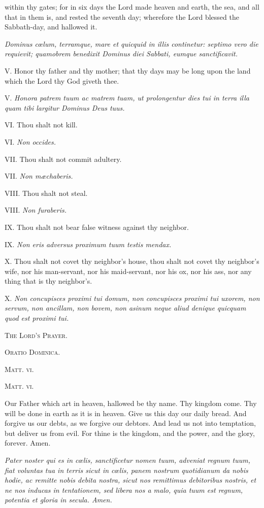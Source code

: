 within thy gates; for in six days the Lord made heaven and earth, the sea, and all that in them is, and rested the seventh day; wherefore the Lord blessed the Sabbath-day, and hallowed it.

\emph{Dominus cœlum, terramque, mare et quicquid in illis continetur: septimo vero die requievit; quamobrem benedixit Dominus diei Sabbati, eumque sanctificavit.}

V. Honor thy father and thy mother; that thy days may be long upon the land which the Lord thy God giveth thee.

V. \emph{Honora patrem tuum ac matrem tuam, ut prolongentur dies tui in terra illa quam tibi largitur Dominus Deus tuus.}

VI. Thou shalt not kill.

VI. \emph{Non occides.}

VII. Thou shalt not commit adultery.

VII. \emph{Non mæchaberis.}

VIII. Thou shalt not steal.

VIII. \emph{Non furaberis.}

IX. Thou shalt not bear false witness against thy neighbor.

IX. \emph{Non eris adversus proximum tuum testis mendax.}

X. Thou shalt not covet thy neighbor's house, thou shalt not covet thy neighbor's wife, nor his man-servant, nor his maid-servant, nor his ox, nor his ass, nor any thing that is thy neighbor's.

X. \emph{Non concupisces proximi tui domum, non concupisces proximi tui uxorem, non servum, non ancillam, non bovem, non asinum neque aliud denique quicquam quod est proximi tui.}

T\textsc{he} L\textsc{ord's} P\textsc{rayer}.

O\textsc{ratio} D\textsc{ominica}.

M\textsc{att. vi}.

M\textsc{att. vi.}

Our Father which art in heaven, hallowed be thy name. Thy kingdom come. Thy will be done in earth as it is in heaven. Give us this day our daily bread. And forgive us our debts, as we forgive our debtors. And lead us not into temptation, but deliver us from evil. For thine is the kingdom, and the power, and the glory, forever. Amen.

\emph{Pater noster qui es in cœlis, sanctificetur nomen tuum, adveniat regnum tuum, fiat voluntas tua in terris sicut in cœlis, panem nostrum quotidianum da nobis hodie, ac remitte nobis debita nostra, sicut nos remittimus debitoribus nostris, et ne nos inducas in tentationem, sed libera nos a malo, quia tuum est regnum, potentia et gloria in secula. Amen.}

